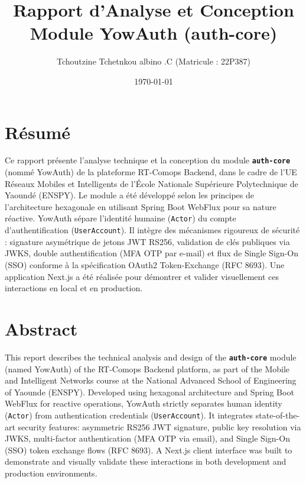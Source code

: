 \documentclass[
]{IPLeiriaThesis}
\title{Rapport d'Analyse et Conception\\Module YowAuth (auth-core)}
\author{Tchoutzine Tchetnkou albino .C (Matricule : 22P387)}
\date{\today}
\newcommand{\code}[1]{\texttt{\small #1}}
\begin{document}
\maketitle


\chapter*{Résumé}
Ce rapport présente l'analyse technique et la conception du module \textbf{\code{auth-core}} (nommé YowAuth) de la plateforme RT-Comops Backend, dans le cadre de l'UE Réseaux Mobiles et Intelligents de l'École Nationale Supérieure Polytechnique de Yaoundé (ENSPY). Le module a été développé selon les principes de l'architecture hexagonale en utilisant Spring Boot WebFlux pour sa nature réactive. YowAuth sépare l'identité humaine (\code{Actor}) du compte d'authentification (\code{UserAccount}). Il intègre des mécanismes rigoureux de sécurité : signature asymétrique de jetons JWT RS256, validation de clés publiques via JWKS, double authentification (MFA OTP par e-mail) et flux de Single Sign-On (SSO) conforme à la spécification OAuth2 Token-Exchange (RFC 8693). Une application Next.js a été réalisée pour démontrer et valider visuellement ces interactions en local et en production.

\vspace{1.5cm}

\chapter*{Abstract}
This report describes the technical analysis and design of the \textbf{\code{auth-core}} module (named YowAuth) of the RT-Comops Backend platform, as part of the Mobile and Intelligent Networks course at the National Advanced School of Engineering of Yaounde (ENSPY). Developed using hexagonal architecture and Spring Boot WebFlux for reactive operations, YowAuth strictly separates human identity (\code{Actor}) from authentication credentials (\code{UserAccount}). It integrates state-of-the-art security features: asymmetric RS256 JWT signature, public key resolution via JWKS, multi-factor authentication (MFA OTP via email), and Single Sign-On (SSO) token exchange flows (RFC 8693). A Next.js client interface was built to demonstrate and visually validate these interactions in both development and production environments.
\end{document}

